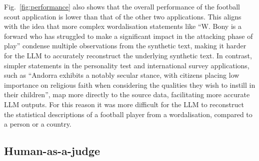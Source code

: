 \documentclass{article}
\begin{document}
Fig.~\ref{fig:performance} also shows that the overall performance of the football scout application is lower than that of the other two applications. This aligns with the idea that more complex wordalisation statements like “W. Bony is a forward who has struggled to make a significant impact in the attacking phase of play” condense multiple observations from the synthetic text, making it harder for the LLM to accurately reconstruct the underlying synthetic text. In contrast, simpler statements in the personality test and international survey applications, such as “Andorra exhibits a notably secular stance, with citizens placing low importance on religious faith when considering the qualities they wish to instill in their children”, map more directly to the source data, facilitating more accurate LLM outputs. For this reason it was more difficult for the LLM to reconstruct the statistical descriptions of a football player from a wordalisation, compared to a person or a country. 



\subsection{Human-as-a-judge}
\end{document}
